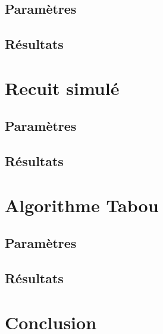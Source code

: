 \documentclass[12pt]{article}
\begin{document}
\subsection{Paramètres}
\subsection{Résultats}

\section{Recuit simulé}
\subsection{Paramètres}
\subsection{Résultats}

\section{Algorithme Tabou}
\subsection{Paramètres}
\subsection{Résultats}

\section{Conclusion}
		
\end{document}
